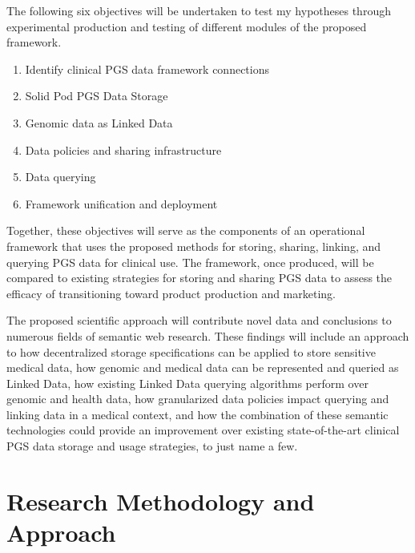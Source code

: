 \documentclass[runningheads]{llncs}
\begin{document}
The following six objectives will be undertaken to test my hypotheses through experimental production and testing of different modules of the proposed framework.
\begin{enumerate}
    \item Identify clinical PGS data framework connections
    \item Solid Pod PGS Data Storage
    \item Genomic data as Linked Data
    \item Data policies and sharing infrastructure
    \item Data querying
    \item Framework unification and deployment
\end{enumerate}

Together, these objectives will serve as the components of an operational framework that uses the proposed methods for storing, sharing, linking, and querying PGS data for clinical use. The framework, once produced, will be compared to existing strategies for storing and sharing PGS data to assess the efficacy of transitioning toward product production and marketing.

The proposed scientific approach will contribute novel data and conclusions to numerous fields of semantic web research. These findings will include an approach to how decentralized storage specifications can be applied to store sensitive medical data, how genomic and medical data can be represented and queried as Linked Data, how existing Linked Data querying algorithms perform over genomic and health data, how granularized data policies impact querying and linking data in a medical context, and how the combination of these semantic technologies could provide an improvement over existing state-of-the-art clinical PGS data storage and usage strategies, to just name a few.


\section{Research Methodology and Approach}

\end{document}
